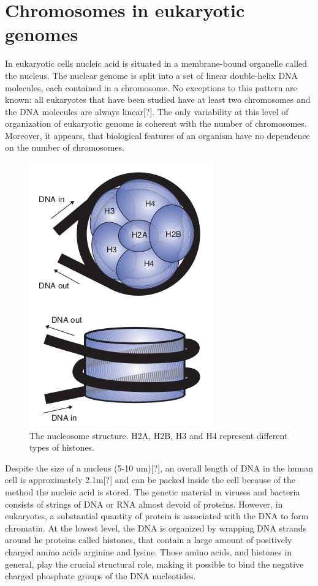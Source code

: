\section{Chromosomes in eukaryotic genomes}

In eukaryotic cells nucleic acid is situated in a membrane-bound organelle called the nucleus. The nuclear genome is split into a set of linear double-helix DNA molecules, each contained in a chromosome. No exceptions to this pattern are known: all eukaryotes that have been studied have at least two chromosomes and the DNA molecules are always linear[?]. The only variability at this level of organization of eukaryotic genome is coherent with the number of chromosomes. Moreover, it appears, that biological features of an organism have no dependence on the number of chromosomes. 

\begin{figure}[!ht]
	\centering
	\includegraphics[width=.5\textwidth]{figures/nucleoDetailed}
	\caption{The nucleosome structure. H2A, H2B, H3 and H4 represent different types of histones. \label{o:latex_friendly_zone}}
\end{figure}

Despite the size of a nucleus (5-10 um)[?], an overall length of DNA in the human cell is approximately 2.1m[?] and can be packed inside the cell because of the method the nucleic acid is stored. The genetic material in viruses and bacteria consists of strings of DNA or RNA almost devoid of proteins. However, in eukaryotes, a substantial quantity of protein is associated with the DNA to form chromatin. At the lowest level, the DNA is organized by wrapping DNA strands around he proteins called histones, that contain a large amount of positively charged amino acids arginine and lysine. Those amino acids, and histones in general, play the crucial structural role, making it possible to bind the negative charged phosphate groups of the DNA nucleotides.

